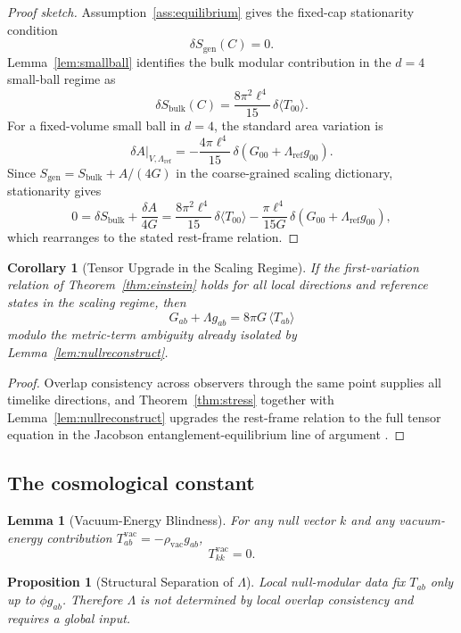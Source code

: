\documentclass[11pt]{article}
\newtheorem{corollary}[theorem]{Corollary}
\newtheorem{proposition}[theorem]{Proposition}
\newtheorem{lemma}[theorem]{Lemma}
\begin{document}
\begin{proof}[Proof sketch]
Assumption~\ref{ass:equilibrium} gives the fixed-cap stationarity condition
\[
\delta S_{\mathrm{gen}}(C)=0.
\]
Lemma~\ref{lem:smallball} identifies the bulk modular contribution in the $d=4$ small-ball regime as
\[
\delta S_{\mathrm{bulk}}(C)=\frac{8\pi^2\ell^4}{15}\,\delta\langle T_{00}\rangle.
\]
For a fixed-volume small ball in $d=4$, the standard area variation is
\[
\delta A\big|_{V,\Lambda_{\mathrm{ref}}}
=
-\frac{4\pi\ell^4}{15}\,
\delta\!\left(G_{00}+\Lambda_{\mathrm{ref}}g_{00}\right).
\]
Since $S_{\mathrm{gen}}=S_{\mathrm{bulk}}+A/(4G)$ in the coarse-grained scaling dictionary, stationarity gives
\[
0=\delta S_{\mathrm{bulk}}+\frac{\delta A}{4G}
=
\frac{8\pi^2\ell^4}{15}\,\delta\langle T_{00}\rangle
-\frac{\pi\ell^4}{15G}\,
\delta\!\left(G_{00}+\Lambda_{\mathrm{ref}}g_{00}\right),
\]
which rearranges to the stated rest-frame relation.
\end{proof}

\begin{corollary}[Tensor Upgrade in the Scaling Regime]\label{cor:einstein}
If the first-variation relation of Theorem~\ref{thm:einstein} holds for all local directions and reference states in the scaling regime, then
\[
G_{ab}+\Lambda g_{ab}=8\pi G\,\langle T_{ab}\rangle
\]
modulo the metric-term ambiguity already isolated by Lemma~\ref{lem:nullreconstruct}.
\end{corollary}

\begin{proof}
Overlap consistency across observers through the same point supplies all timelike directions, and Theorem~\ref{thm:stress} together with Lemma~\ref{lem:nullreconstruct} upgrades the rest-frame relation to the full tensor equation in the Jacobson entanglement-equilibrium line of argument \cite{Jacobson95,Jacobson16}.
\end{proof}

\subsection{The cosmological constant}

\begin{lemma}[Vacuum-Energy Blindness]\label{lem:vac}
For any null vector $k$ and any vacuum-energy contribution $T^{\mathrm{vac}}_{ab}=-\rho_{\mathrm{vac}}g_{ab}$,
\[
T^{\mathrm{vac}}_{kk}=0.
\]
\end{lemma}

\begin{proposition}[Structural Separation of $\Lambda$]\label{prop:lambda}
Local null-modular data fix $T_{ab}$ only up to $\phi g_{ab}$. Therefore $\Lambda$ is not determined by local overlap consistency and requires a global input.
\end{proposition}
\end{document}
